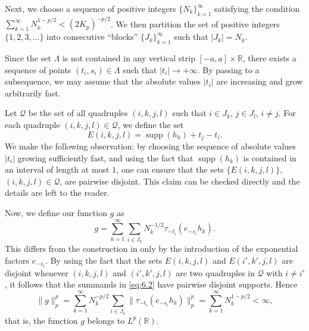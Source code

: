 \documentclass[reqno,a4paper,12pt]{amsart}
\numberwithin{equation}{section}
\numberwithin{figure}{section}
\newcommand\R{\mathbb{R}}
\newcommand\Lam{\Lambda}
\newcommand\1{\mathds{1}}
\newcommand{\ts}{\tau}
\newcommand{\supp}{\operatorname{supp}}
\theoremstyle{plain}
\theoremstyle{definition}
\begin{document}
Next, we choose a sequence of positive integers 
$\{N_k\}_{k=1}^\infty$ satisfying the condition 
$\sum_{k=1}^\infty N_k^{1-p/2} < (2K_p)^{-p/2}$.
We then partition the set of positive integers 
$\{1,2,3,\dots\}$ into consecutive ``blocks'' 
$\{J_k\}_{k=1}^\infty$ such that 
$|J_k| = N_k$.

Since the set $\Lam$ is not
 contained in any vertical strip $[-a, a]\times\R$,
there exists a sequence of points $(t_i, s_i) \in \Lam$
 such that $|t_i| \to +\infty$. 
By passing to a subsequence, we may assume that the absolute values
$|t_i|$ are increasing and grow arbitrarily fast.  

Let $\mathcal{Q}$ be the set of all quadruples $(i, k, j, l)$ 
such that $i \in J_k$, $j \in J_l$,  $i \neq j$. 
For each quadruple $(i, k, j, l) \in \mathcal{Q}$, we define the set
\begin{equation}
\label{eq:6.1}
E(i,k,j,l) = \supp(h_k) + t_j - t_i.
\end{equation}
We make the following observation:
by choosing the sequence of absolute values
$|t_i|$ growing sufficiently fast, 
and using the fact that $\supp(h_k)$ is contained
in an interval of length at most $1$,
one can ensure that the sets
$\{E(i,k,j,l) \}$, $ (i,k,j,l) \in \mathcal{Q}$,
are pairwise disjoint.
This claim can be checked directly and the
details are left to the reader.


Now, we define our function $g$ as
\begin{equation}\label{eq:6.2}
g = \sum_{k=1}^\infty \sum_{i \in J_k} N_k^{-1/2}  \ts_{-t_i} (e_{-s_i} h_k).
\end{equation}
This differs from the construction in \cite[Theorem 3.2]{FOSZ14} only by the introduction of the exponential factors $e_{-s_i}$. By using the fact that
 the sets $ E(i,k,j,l) $ and $E(i',k',j,l)$ are disjoint 
whenever $(i,k,j,l)$ and  $(i',k',j,l)$ are  two quadruples in $\mathcal{Q}$
with $i \ne i'$, it follows that the summands in  \eqref{eq:6.2} have
pairwise disjoint supports. Hence
\begin{equation}
\|g\|^p_p = \sum_{k=1}^\infty N_k^{-p/2}\sum_{i \in J_k}\|\ts_{-t_i}  (e_{-s_i} h_k)\|_p^p 
= \sum_{k=1}^\infty N_k^{1-p/2} < \infty,
\end{equation}
that is, the function $g$ belongs to $L^p(\R)$.
\end{document}
